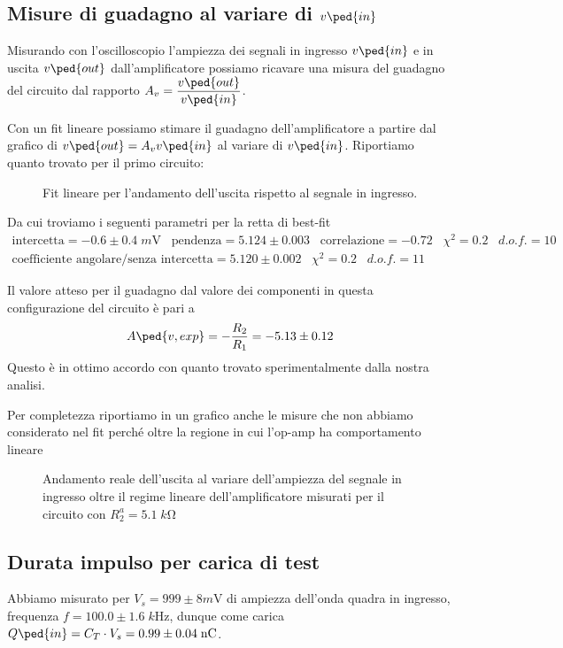\documentclass[10pt,a4paper]{article}
\begin{document}
\setcounter{subsection}{3}
\subsection{Misure di guadagno al variare di $v\ped{in}$}
Misurando con l'oscilloscopio l'ampiezza dei segnali in ingresso $v\ped{in}$
e in uscita $v\ped{out}$ dall'amplificatore possiamo ricavare una misura del
guadagno del circuito dal rapporto $A_v = \dfrac{v\ped{out}}{v\ped{in}}$.

Con un fit lineare possiamo stimare il guadagno dell'amplificatore a partire
dal grafico di $v\ped{out} = A_v v\ped{in}$ al variare di $v\ped{in}$.
Riportiamo quanto trovato per il primo circuito:
\begin{figure}[htbp]
\centering
\caption{Fit lineare per l'andamento dell'uscita rispetto al segnale in
ingresso. \label{fig: gainfit}}
\end{figure}
Da cui troviamo i seguenti parametri per la retta di best-fit
\begin{align*}
\mathrm{intercetta} = -0.6 \pm 0.4 \; \si{m\V} \;\;\;\mathrm{pendenza} = 5.124 
\pm 0.003 \;\;\;\mathrm{correlazione} 
= -0.72 \;\;\; \chi^2 = 0.2 \;\;\; d.o.f. = 10 \\
\text{coefficiente angolare/senza intercetta} = 5.120 \pm 0.002 \;\;\;
\chi^2 = 0.2 \;\;\; d.o.f. = 11
\end{align*}

Il valore atteso per il guadagno dal valore dei componenti in questa
configurazione del circuito è pari a
\[
A\ped{v, exp} = -\frac{R_2}{R_1} = - 5.13 \pm 0.12
\]
Questo è in ottimo accordo con quanto trovato sperimentalmente dalla nostra
analisi.

Per completezza riportiamo in un grafico anche le misure che non abbiamo
considerato nel fit perché oltre la regione in cui l'op-amp ha comportamento
lineare
\begin{figure}[htbp]
\centering
\caption{Andamento reale dell'uscita al variare dell'ampiezza del segnale in
ingresso oltre il regime lineare dell'amplificatore misurati per il circuito
con $R_2^a = 5.1 \; \si{k\ohm}$ \label{fig: gainsat}}
\end{figure}

\subsection{Durata impulso per carica di test}
Abbiamo misurato per $V_s = 999 \pm 8 \si{m\V}$ di ampiezza dell'onda quadra
in ingresso, frequenza $f = 100.0 \pm 1.6 \; \si{k\Hz}$, dunque come carica
$Q\ped{in} = C_T \cdot V_s = 0.99 \pm 0.04 \; \si{n\coulomb}$.
\end{document}
